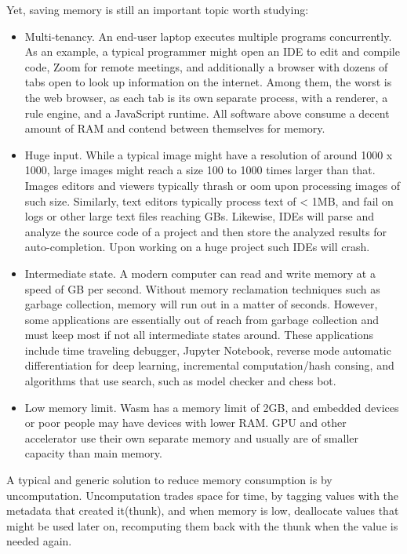 Yet, saving memory is still an important topic worth studying:
\begin{itemize}
    \item Multi-tenancy. An end-user laptop executes multiple programs concurrently. As an example, a typical programmer might open an IDE to edit and compile code, Zoom for remote meetings, and additionally a browser with dozens of tabs open to look up information on the internet. Among them, the worst is the web browser, as each tab is its own separate process, with a renderer, a rule engine, and a JavaScript runtime. All software above consume a decent amount of RAM and contend between themselves for memory.
    \item Huge input. While a typical image might have a resolution of around 1000 x 1000, large images might reach a size 100 to 1000 times larger than that. Images editors and viewers typically thrash or oom upon processing images of such size. Similarly, text editors typically process text of < 1MB, and fail on logs or other large text files reaching GBs. Likewise, IDEs will parse and analyze the source code of a project and then store the analyzed results for auto-completion. Upon working on a huge project such IDEs will crash.
    \item Intermediate state. A modern computer can read and write memory at a speed of GB per second. Without memory reclamation techniques such as garbage collection, memory will run out in a matter of seconds. However, some applications are essentially out of reach from garbage collection and must keep most if not all intermediate states around. These applications include time traveling debugger, Jupyter Notebook, reverse mode automatic differentiation for deep learning, incremental computation/hash consing, and algorithms that use search, such as model checker and chess bot.
    \item Low memory limit. Wasm has a memory limit of 2GB, and embedded devices or poor people may have devices with lower RAM. GPU and other accelerator use their own separate memory and usually are of smaller capacity than main memory.
\end{itemize}

A typical and generic solution to reduce memory consumption is by uncomputation. Uncomputation trades space for time, by tagging values with the metadata that created it(thunk), and when memory is low, deallocate values that might be used later on, recomputing them back with the thunk when the value is needed again.

